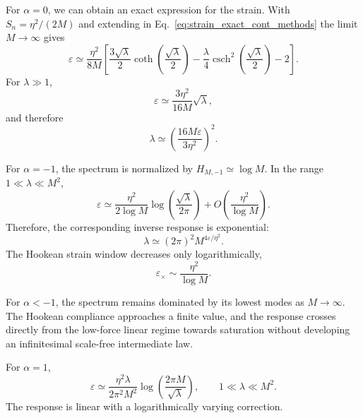 \documentclass[pdflatex, twocolumn, sn-nature]{sn-jnl}
\begin{document}
For $\alpha=0$, we can obtain an exact expression for the strain. With $S_n=\eta^2/(2M)$ and extending in Eq.~\eqref{eq:strain_exact_cont_methods} the limit $M\rightarrow \infty$ gives
\begin{equation}
\varepsilon
\simeq
\frac{\eta^2}{8M}
\left[
\frac{3\sqrt{\lambda}}{2}
\coth\left(\frac{\sqrt{\lambda}}{2}\right)
-
\frac{\lambda}{4}
\operatorname{csch}^2
\left(\frac{\sqrt{\lambda}}{2}\right)
-
2
\right].
\label{eq:alpha_zero_exact_methods}
\end{equation}
For $\lambda \gg 1$,
\begin{equation}
\varepsilon
\simeq
\frac{3\eta^2}{16M}\sqrt{\lambda},
\end{equation}
and therefore
\begin{equation}
\lambda
\simeq
\left(
\frac{16M\varepsilon}{3\eta^2}
\right)^2.
\end{equation}


For $\alpha=-1$, the spectrum is normalized by $H_{M,-1}\simeq\log M$. In the range $1\ll\lambda\ll M^2$,
\begin{equation}
\varepsilon
\simeq
\frac{\eta^2}{2\log M}
\log\left(
\frac{\sqrt{\lambda}}{2\pi}
\right)
+
O\left(
\frac{\eta^2}{\log M}
\right).
\end{equation}
Therefore, the corresponding inverse response is exponential:
\begin{equation}
\lambda
\simeq
(2\pi)^2 M^{4 \varepsilon/\eta^2}.
\end{equation}
The Hookean strain window decreases only logarithmically,
\begin{equation}
\varepsilon_\times
\sim
\frac{\eta^2}{\log M}.
\end{equation}

For $\alpha<-1$, the spectrum remains dominated by its lowest modes as $M\rightarrow\infty$. The Hookean compliance approaches a finite value, and the response crosses directly from the low-force linear regime towards saturation without developing an infinitesimal scale-free intermediate law.

For $\alpha=1$,
\begin{equation}
\varepsilon
\simeq
\frac{\eta^2\lambda}{2\pi^2M^2}
\log\left(
\frac{2\pi M}{\sqrt{\lambda}}
\right),
\qquad
1\ll\lambda\ll M^2.
\end{equation}
The response is linear with a logarithmically varying correction.
\end{document}

